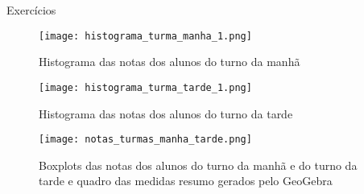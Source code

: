 {{{\begin{answer}{Exercícios}
{\begin{multicols}{2}
\begin{figure}[H]
  \texttt{[image: histograma\_turma\_manha\_1.png]}
  \caption{Histograma das notas dos alunos do turno da manhã}
  
  \end{figure}
  \begin{figure}[H]
  \centering
  
  \texttt{[image: histograma\_turma\_tarde\_1.png]}
  \caption{Histograma das notas dos alunos do turno da tarde}
  
  \end{figure}
\end{multicols}
  \begin{figure}[H]
  \centering
  
  \texttt{[image: notas\_turmas\_manha\_tarde.png]}
   \caption{Boxplots das notas dos alunos do turno da manhã e do turno da tarde e quadro das medidas resumo gerados pelo GeoGebra}
  

\end{figure}}
\end{answer}}}}
